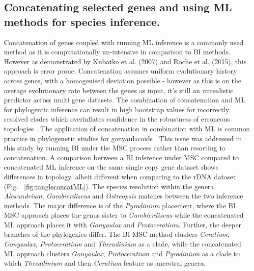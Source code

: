\documentclass[12pt]{article}
\begin{document}
\subsection*{Concatenating selected genes and using ML methods for species inference.}
\FloatBarrier
Concatenation of genes coupled with running ML inference is a commonly used method as it is computationally un-intensive in comparison to BI methods. 
However as demonstrated by Kubatko et al. (2007) and Roche et al. (2015), this approach is error prone. 
Concatenation assumes uniform evolutionary history across genes, with a homogenised deviation possible - however as this is on the average evolutionary rate between the genes as input, it's still an unrealistic predictor across multi gene datasets. 
The combination of concatenation and ML for phylogentic inference can result in high bootstrap values for incorrectly resolved clades which overinflates confidence in the robustness of erroneous topologies \cite{degnan2009gene}. 
The application of concatenation in combination with ML is common practice in phylogenetic studies for gonyaulacoids  \cite{shalchian2006combined,zhang2007three,saldarriaga2004molecular,murray2005improving,hoppenrath2010dinoflagellate}.
This issue was addressed in this study by running BI under the MSC process rather than resorting to concatenation. 
A comparison between a BI inference under MSC compared to concatenated ML inference on the same single copy gene dataset shows differences in topology, albeit different when comparing to the rDNA dataset (Fig. ~\ref{fig:tangleconcatML}). 
The species resolution within the genera \emph{Alexandrium}, \emph{Gambierdiscus} and \emph{Ostreopsis} matches between the two inference methods. 
The major difference is of the \emph{Pyrodinium} placement, where the BI MSC approach places the genus sister to \emph{Gambierdiscus} while the concatenated ML approach places it with \emph{Gonyaulax} and \emph{Protoceratium}. 
Further, the deeper branches of the phylogenies differ. 
The BI MSC method clusters \emph{Ceratium}, \emph{Gonyaulax}, \emph{Protoceratium} and \emph{Thecadinium} as a clade, while the concatenated ML approach clusters \emph{Gonyaulax}, \emph{Protoceratium} and \emph{Pyrodinium} as a clade to which \emph{Thecadinium} and then \emph{Ceratium} feature as ancestral genera. 
\end{document}
